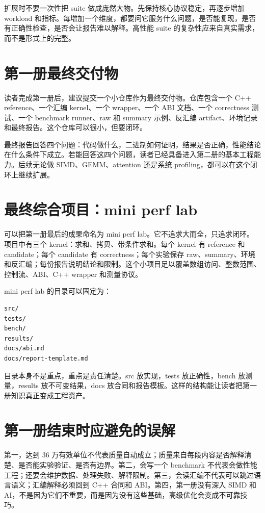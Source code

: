 扩展时不要一次性把 suite 做成庞然大物。先保持核心协议稳定，再逐步增加 workload 和指标。每增加一个维度，都要问它服务什么问题，是否能复现，是否有正确性检查，是否会让报告难以解释。高性能 suite 的复杂性应来自真实需求，而不是形式上的完整。

\section{第一册最终交付物}

读者完成第一册后，建议提交一个小仓库作为最终交付物。仓库包含一个 C++ reference、一个汇编 kernel、一个 wrapper、一个 ABI 文档、一个 correctness 测试、一个 benchmark runner、raw 和 summary 示例、反汇编 artifact、环境记录和最终报告。这个仓库可以很小，但要闭环。

最终报告回答四个问题：代码做什么，二进制如何证明，结果是否正确，性能结论在什么条件下成立。若能回答这四个问题，读者已经具备进入第二册的基本工程能力。后续无论做 SIMD、GEMM、attention 还是系统 profiling，都可以在这个闭环上继续扩展。

\section{最终综合项目：mini perf lab}

可以把第一册最后的成果命名为 mini perf lab。它不追求大而全，只追求闭环。项目中有三个 kernel：求和、拷贝、带条件求和。每个 kernel 有 reference 和 candidate；每个 candidate 有 correctness；每个实验保存 raw、summary、环境和反汇编；每份报告说明结论和限制。这个小项目足以覆盖数组访问、整数范围、控制流、ABI、C++ wrapper 和测量协议。

mini perf lab 的目录可以固定为：

\begin{lstlisting}
src/
tests/
bench/
results/
docs/abi.md
docs/report-template.md
\end{lstlisting}

目录本身不是重点，重点是责任清楚。src 放实现，tests 放正确性，bench 放测量，results 放不可变结果，docs 放合同和报告模板。这样的结构能让读者把第一册知识真正变成工程资产。

\section{第一册结束时应避免的误解}

第一，达到 36 万有效单位不代表质量自动成立；质量来自每段内容是否解释清楚、是否能实验验证、是否有边界。第二，会写一个 benchmark 不代表会做性能工程；还要会维护数据、处理失败、解释限制。第三，会读汇编不代表可以跳过语言语义；汇编解释必须回到 C++ 合同和 ABI。第四，第一册没有深入 SIMD 和 AI，不是因为它们不重要，而是因为没有这些基础，高级优化会变成不可靠技巧。

